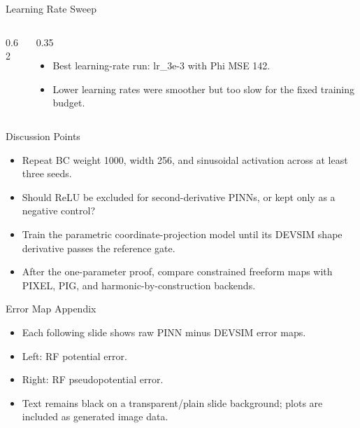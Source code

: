 \documentclass[aspectratio=169,professionalfonts]{beamer}
\begin{document}
\begin{frame}[t]{Learning Rate Sweep}
\begin{columns}[T,onlytextwidth]
\begin{column}{0.62\textwidth}
\scriptsize
{}
\end{column}
\begin{column}{0.35\textwidth}
\begin{itemize}
  \item Best learning-rate run: lr\_3e-3 with Phi MSE 142.
  \item Lower learning rates were smoother but too slow for the fixed training budget.
\end{itemize}
\end{column}
\end{columns}
\end{frame}

\begin{frame}[t]{Discussion Points}
\begin{itemize}
  \item Repeat BC weight 1000, width 256, and sinusoidal activation across at least three seeds.
  \item Should ReLU be excluded for second-derivative PINNs, or kept only as a negative control?
  \item Train the parametric coordinate-projection model until its DEVSIM shape derivative passes the reference gate.
  \item After the one-parameter proof, compare constrained freeform maps with PIXEL, PIG, and harmonic-by-construction backends.
\end{itemize}
\end{frame}

\begin{frame}[t]{Error Map Appendix}
\begin{itemize}
  \item Each following slide shows raw PINN minus DEVSIM error maps.
  \item Left: RF potential error.
  \item Right: RF pseudopotential error.
  \item Text remains black on a transparent/plain slide background; plots are included as generated image data.
\end{itemize}
\end{frame}
\end{document}
